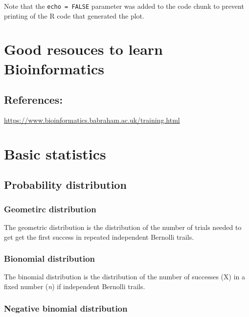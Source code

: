 \documentclass[]{book}
\begin{document}
Note that the \texttt{echo\ =\ FALSE} parameter was added to the code chunk to prevent printing of the R code that generated the plot.

\hypertarget{good-resouces-to-learn-bioinformatics}{%
\chapter{Good resouces to learn Bioinformatics}\label{good-resouces-to-learn-bioinformatics}}

\hypertarget{references}{%
\section{References:}\label{references}}

\url{https://www.bioinformatics.babraham.ac.uk/training.html}

\hypertarget{basic-statistics}{%
\chapter{Basic statistics}\label{basic-statistics}}

\hypertarget{probability-distribution}{%
\section{Probability distribution}\label{probability-distribution}}

\hypertarget{geometirc-distribution}{%
\subsection{Geometirc distribution}\label{geometirc-distribution}}

The geometric distribution is the distribution of the number of trials needed to get get the first success in repeated independent Bernolli trails.

\hypertarget{bionomial-distribution}{%
\subsection{Bionomial distribution}\label{bionomial-distribution}}

The binomial distribution is the distribution of the number of successes (X) in a fixed number (\emph{n}) if independent Bernolli trails.

\hypertarget{negative-binomial-distribution}{%
\subsection{Negative binomial distribution}\label{negative-binomial-distribution}}
\end{document}
